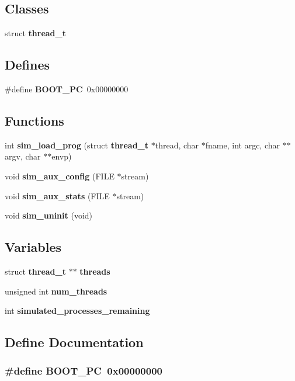 \subsection*{Classes}
\begin{CompactItemize}
\item 
struct {\bf thread\_\-t}
\end{CompactItemize}
\subsection*{Defines}
\begin{CompactItemize}
\item 
\#define {\bf BOOT\_\-PC}~0x00000000
\end{CompactItemize}
\subsection*{Functions}
\begin{CompactItemize}
\item 
int {\bf sim\_\-load\_\-prog} (struct {\bf thread\_\-t} $\ast$thread, char $\ast$fname, int argc, char $\ast$$\ast$argv, char $\ast$$\ast$envp)
\item 
void {\bf sim\_\-aux\_\-config} (FILE $\ast$stream)
\item 
void {\bf sim\_\-aux\_\-stats} (FILE $\ast$stream)
\item 
void {\bf sim\_\-uninit} (void)
\end{CompactItemize}
\subsection*{Variables}
\begin{CompactItemize}
\item 
struct {\bf thread\_\-t} $\ast$$\ast$ {\bf threads}
\item 
unsigned int {\bf num\_\-threads}
\item 
int {\bf simulated\_\-processes\_\-remaining}
\end{CompactItemize}


\subsection{Define Documentation}
\subsubsection[{BOOT\_\-PC}]{\setlength{\rightskip}{0pt plus 5cm}\#define BOOT\_\-PC~0x00000000}\label{thread_8h_3e8bd7832d770102979335a24585c78f}




